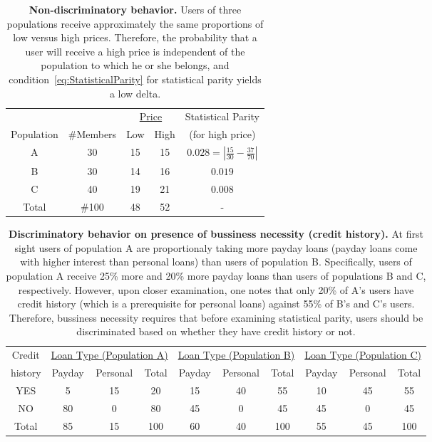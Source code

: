 \begin{table}[t]
{\scriptsize
  \renewcommand{\arraystretch}{1.5}
  \begin{tabular}{ c | c | c  c | c }
    & & \multicolumn{2}{|c|}{\underline{Price}} &  Statistical Parity\\
    Population & \#Members & Low & High & (for high price) \\
    \hline
    A & 30 &  15 & 15 & $0.028 = | \frac{15}{30} - \frac{37}{70}|$ \\
    B & 30 &  14 & 16 & $0.019$ \\
    C & 40 &  19 & 21 & $0.008$ \\
    \hline
    Total & \#100 & 48 & 52 & - \\
  \end{tabular}
  \caption{{\bf Non-discriminatory behavior.} Users of three populations receive approximately
  the same proportions of low versus high prices. Therefore, the probability that a user
  will receive a high price is independent of the population to which he or she belongs,
  and condition~\ref{eq:StatisticalParity} for statistical parity yields a low delta.}
  \label{tab:NonDiscriminationExample}
}
\end{table}

\begin{table*}[t]
{ \small
  \center
  \renewcommand{\arraystretch}{1.5}
  \begin{tabular}{ c | c c c | c c c | c c c}
    Credit
    & \multicolumn{3}{|c|}{\underline{Loan Type (Population A)}}
    & \multicolumn{3}{|c}{\underline{Loan Type (Population B) }}
    & \multicolumn{3}{|c}{\underline{Loan Type (Population C) }} \\
    history & Payday & Personal & Total & Payday & Personal & Total & Payday & Personal & Total \\
    \hline
    YES & 5  & 15 & 20 & 15 & 40 & 55 & 10 & 45 & 55 \\
    NO  & 80 & 0  & 80 & 45 & 0 & 45 & 45 & 0 & 45\\
    \hline
    Total & 85 & 15 & 100 & 60 & 40 & 100 & 55 & 45 & 100\\
  \end{tabular}
  \caption{{\bf Discriminatory behavior on presence of bussiness necessity (credit history).}
    At first sight users of population A are proportionaly taking more payday loans
    (payday loans come with higher interest than personal loans) than users of population B.
    Specifically, users of population A receive 25\% more and 20\% more  payday loans than
    users of populations B and C, respectively. However, upon closer examination, one notes
    that only 20\% of A's users have credit history (which is a prerequisite for personal
    loans) against 55\% of B's and C's users. Therefore, bussiness necessity requires that
    before examining statistical parity, users should be discriminated based on whether
    they have credit history or not.
  }
  \label{tab:BusinessNessecity}
}
\end{table*}

